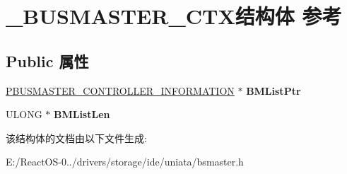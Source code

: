 \hypertarget{struct___b_u_s_m_a_s_t_e_r___c_t_x}{}\section{\+\_\+\+B\+U\+S\+M\+A\+S\+T\+E\+R\+\_\+\+C\+T\+X结构体 参考}
\label{struct___b_u_s_m_a_s_t_e_r___c_t_x}
\subsection*{Public 属性}
\begin{DoxyCompactItemize}
\item 
\mbox{\label{struct___b_u_s_m_a_s_t_e_r___c_t_x_a034977ac4105594310691c4084043562}} 
\hyperlink{struct___b_u_s_m_a_s_t_e_r___c_o_n_t_r_o_l_l_e_r___i_n_f_o_r_m_a_t_i_o_n}{P\+B\+U\+S\+M\+A\+S\+T\+E\+R\+\_\+\+C\+O\+N\+T\+R\+O\+L\+L\+E\+R\+\_\+\+I\+N\+F\+O\+R\+M\+A\+T\+I\+ON} $\ast$ {\bfseries B\+M\+List\+Ptr}
\item 
\mbox{\label{struct___b_u_s_m_a_s_t_e_r___c_t_x_a1669991a7315171531e8c484ec7e75c2}} 
U\+L\+O\+NG $\ast$ {\bfseries B\+M\+List\+Len}
\end{DoxyCompactItemize}


该结构体的文档由以下文件生成\+:\begin{DoxyCompactItemize}
\item 
E\+:/\+React\+O\+S-\/0../drivers/storage/ide/uniata/bsmaster.\+h\end{DoxyCompactItemize}
